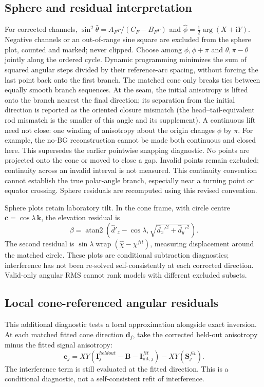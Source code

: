 \documentclass[10pt,a4paper]{article}
\begin{document}
\subsection*{Sphere and residual interpretation}
For corrected channels, $\sin^2\widehat\theta=A_Fr/(C_F-B_Fr)$ and $\widehat\phi=\tfrac12\arg(X+\mathrm iY)$. Negative channels or an out-of-range sine square are excluded from the sphere plot, counted and marked; never clipped. Choose among $\phi,\phi+\pi$ and $\theta,\pi-\theta$ jointly along the ordered cycle. Dynamic programming minimizes the sum of squared angular steps divided by their reference-arc spacing, without forcing the last point back onto the first branch. The matched cone only breaks ties between equally smooth branch sequences. At the seam, the initial anisotropy is lifted onto the branch nearest the final direction; its separation from the initial direction is reported as the oriented closure mismatch (the head--tail-equivalent rod mismatch is the smaller of this angle and its supplement). A continuous lift need not close: one winding of anisotropy about the origin changes $\phi$ by $\pi$. For example, the no-BG reconstruction cannot be made both continuous and closed here. This supersedes the earlier pointwise snapping diagnostic. No points are projected onto the cone or moved to close a gap. Invalid points remain excluded; continuity across an invalid interval is not measured. This continuity convention cannot establish the true polar-angle branch, especially near a turning point or equator crossing. Sphere residuals are recomputed using this revised convention.

Sphere plots retain laboratory tilt. In the cone frame, with circle centre $\mathbf c=\cos\lambda\,\mathbf k$, the elevation residual is
\[
\beta=\operatorname{atan2}(\widehat d'_z-\cos\lambda,\sqrt{\widehat d_x'^2+\widehat d_y'^2}).
\]
The second residual is $\sin\lambda\operatorname{wrap}(\widehat\chi-\chi^{fit})$, measuring displacement around the matched circle. These plots are conditional subtraction diagnostics; interference has not been re-solved self-consistently at each corrected direction. Valid-only angular RMS cannot rank models with different excluded subsets.
\newpage\subsection*{Local cone-referenced angular residuals}
This additional diagnostic tests a local approximation alongside exact inversion. At each matched fitted cone direction $\mathbf d_j$, take the corrected held-out anisotropy minus the fitted signal anisotropy:
\[\mathbf e_j=XY(\mathbf I^{heldout}_j-\mathbf B-\mathbf I_{\mathrm{int},j}^{fit})-XY(\mathbf S_j^{fit}).\]
The interference term is still evaluated at the fitted direction. This is a conditional diagnostic, not a self-consistent refit of interference.
\end{document}
